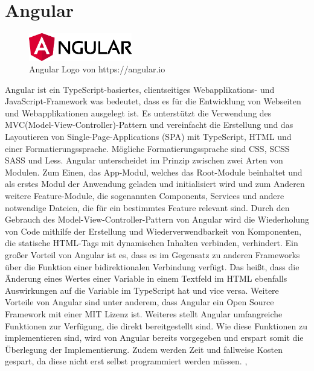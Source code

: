 \section{Angular}
\begin{figure}
    \begin{center}
      \includegraphics[width=0.4\textwidth]{pics/Angular_Logo.png}
      \caption{Angular Logo von https://angular.io}
    \end{center}
\end{figure}
Angular ist ein TypeScript-basiertes, clientseitiges Webapplikations- und JavaScript-Framework 
was bedeutet, dass es für die Entwicklung von Webseiten und Webapplikationen ausgelegt ist. 
Es unterstützt die Verwendung des MVC(Model-View-Controller)-Pattern und vereinfacht die 
Erstellung und das Layoutieren von Single-Page-Applications (SPA) mit TypeScript,
HTML und einer Formatierungssprache. Mögliche Formatierungssprache sind CSS, SCSS SASS und Less.
\newline
\newline
Angular unterscheidet im Prinzip zwischen zwei Arten von Modulen. Zum Einen, das App-Modul, welches das Root-Module beinhaltet und als erstes Modul der Anwendung geladen und initialisiert 
wird und zum Anderen weitere Feature-Module, die sogenannten Components, Services und andere 
notwendige Dateien, die für ein bestimmtes Feature relevant sind.
Durch den Gebrauch des Model-View-Controller-Pattern von Angular wird die Wiederholung 
von Code mithilfe der Erstellung und Wiederverwendbarkeit von Komponenten, die 
statische HTML-Tags mit dynamischen Inhalten verbinden, verhindert.
\newline
\newline
Ein großer Vorteil von Angular ist es, dass es im Gegensatz zu anderen Frameworks über die Funktion 
einer bidirektionalen Verbindung verfügt. Das heißt, dass die Änderung eines 
Wertes einer Variable in einem Textfeld im HTML ebenfalls Auswirkungen auf die Variable im TypeScript 
hat und vice versa. Weitere Vorteile von Angular sind unter anderem, dass Angular ein 
Open Source Framework mit einer MIT Lizenz ist.
\newline
Weiteres stellt Angular umfangreiche Funktionen zur Verfügung, die direkt bereitgestellt sind.
Wie diese Funktionen zu implementieren sind, wird von Angular bereits vorgegeben und erspart somit 
die Überlegung der Implementierung. Zudem werden Zeit und fallweise Kosten gespart, da diese nicht erst
selbst programmiert werden müssen. \cite{noauthor_angular_nodate}, \cite{noauthor_angular_2021}

